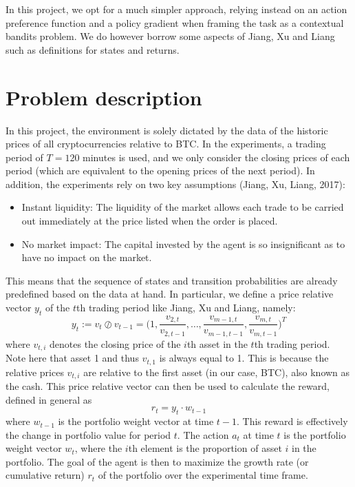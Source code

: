 \documentclass[a4paper,12pt]{article}
\begin{document}
In this project, we opt for a much simpler approach, relying instead on an action preference function and a policy gradient when framing the task as a contextual bandits problem. We do however borrow some aspects of Jiang, Xu and Liang such as definitions for states and returns. \\

\section{Problem description}
In this project, the environment is solely dictated by the data of the historic prices of all cryptocurrencies relative to BTC. In the experiments, a trading period of $T = 120$ minutes is used, and we only consider the closing prices of each period (which are equivalent to the opening prices of the next period). In addition, the experiments rely on two key assumptions (Jiang, Xu, Liang, 2017):

\begin{itemize}
  \item Instant liquidity: The liquidity of the market allows each trade to be carried out immediately at the price listed when the order is placed.
  \item No market impact: The capital invested by the agent is so insignificant as to have no impact on the market.
\end{itemize}

This means that the sequence of states and transition probabilities are already predefined based on the data at hand. In particular, we define a price relative vector $y_t$ of the $t$th trading period like Jiang, Xu and Liang, namely:
$$y_t := v_t \oslash v_{t-1} = \bigg(1,\frac{v_{2,t}}{v_{2,t-1}}, …,\frac{v_{m-1,t}}{v_{m-1,t-1}}, \frac{v_{m,t}}{v_{m,t-1}}\bigg)^T$$ 
where $v_{t,i}$ denotes the closing price of the $i$th asset in the $t$th trading period. Note here that asset 1 and thus $v_{t,1}$ is always equal to 1. This is because the relative prices $v_{t,i}$ are relative to the first asset (in our case, BTC), also known as the cash. This price relative vector can then be used to calculate the reward, defined in general as 
$$r_t = y_t \cdot w_{t-1}$$
where $w_{t-1}$ is the portfolio weight vector at time $t-1$. This reward is effectively the change in portfolio value for period $t$. The action $a_t$ at time $t$ is the portfolio weight vector $w_t$, where the $i$th element is the proportion of asset $i$ in the portfolio. The goal of the agent is then to maximize the growth rate (or cumulative return) $r_t$ of the portfolio over the experimental time frame. \\
\end{document}
